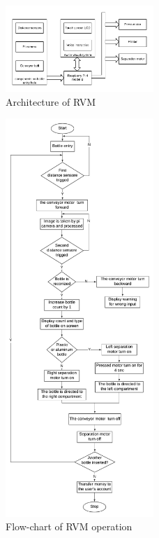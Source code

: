 \documentclass[conference]{IEEEtran}
\begin{document}
\begin{figure}[h!]
  \centering
  \includegraphics[width=0.5\textwidth]{fig1}
  \caption{Architecture of RVM}
\end{figure}
\begin{figure}[H!]
  \centering
  \includegraphics[width=0.5\textwidth]{fig2}
  \caption{Flow-chart of RVM operation}
\end{figure}
\end{document}
